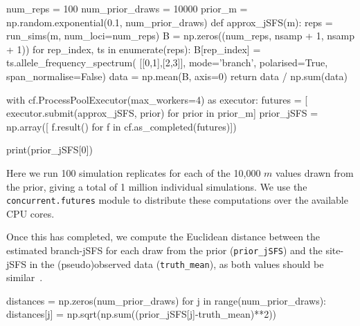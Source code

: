\documentclass[graybox]{svmult}
\begin{document}
\begin{pythoncode}
num_reps = 100
num_prior_draws = 10000
prior_m = np.random.exponential(0.1, num_prior_draws)
def approx_jSFS(m):
    reps = run_sims(m, num_loci=num_reps)
    B = np.zeros((num_reps, nsamp + 1, nsamp + 1))
    for rep_index, ts in enumerate(reps):
        B[rep_index] = ts.allele_frequency_spectrum(
            [[0,1],[2,3]], mode='branch',
            polarised=True, span_normalise=False)
    data = np.mean(B, axis=0)
    return data / np.sum(data)

with cf.ProcessPoolExecutor(max_workers=4) as executor:
    futures = [
        executor.submit(approx_jSFS, prior) for prior in prior_m]
    prior_jSFS = np.array([
        f.result() for f in cf.as_completed(futures)])

print(prior_jSFS[0])
\end{pythoncode}

Here we run 100 simulation replicates for each of the 10,000
$m$ values drawn from the prior, giving a total of 1 million individual simulations.
We use the \texttt{concurrent.futures} module to distribute these
computations over the available CPU cores.

Once this has completed, we compute the Euclidean distance between the estimated branch-jSFS for each
draw from the prior (\texttt{prior\_jSFS}) and the site-jSFS in the (pseudo)observed
data (\texttt{truth\_mean}), as both values should be
similar~\citep{ralph2020efficiently}.
\begin{pythoncode}
distances = np.zeros(num_prior_draws)
for j in range(num_prior_draws):
    distances[j] = np.sqrt(np.sum((prior_jSFS[j]-truth_mean)**2))
\end{pythoncode}
\end{document}
